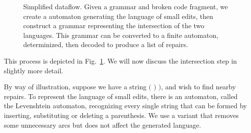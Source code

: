 \documentclass[sigplan,acmsmall,nonacm,screen]{acmart}\settopmatter{printfolios=false,printccs=false,printacmref=false}
\begin{document}
\begin{figure}[h!]
    \caption{Simplified dataflow. Given a grammar and broken code fragment, we create a automaton generating the language of small edits, then construct a grammar representing the intersection of the two languages. This grammar can be converted to a finite automaton, determinized, then decoded to produce a list of repairs.}\label{fig:arch_simp}
  \end{figure}

  \noindent This process is depicted in Fig.~\ref{fig:arch_simp}. We will now discuss the intersection step in slightly more detail.

  \clearpage

  By way of illustration, suppose we have a string $\texttt{( ) )}$, and wish to find nearby repairs. To represent the language of small edits, there is an automaton, called the Levenshtein automaton, recognizing every single string that can be formed by inserting, substituting or deleting a parenthesis. We use a variant that removes some unnecessary arcs but does not affect the generated language.
\end{document}

